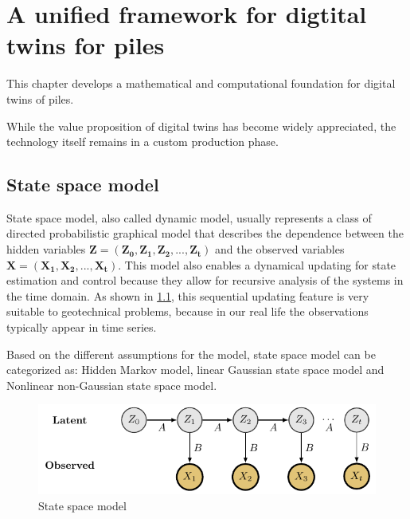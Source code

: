 

\chapter{A unified framework for digtital twins for piles}


This chapter develops a mathematical and computational foundation for digital twins of piles.

While the value proposition of digital twins has become widely appreciated, the technology itself remains in a custom production phase.



\section{State space model}




State space model, also called dynamic model, usually represents a class of directed probabilistic graphical model that describes the dependence between the hidden variables $\boldsymbol{Z} = (\boldsymbol{Z_0},\boldsymbol{Z_1},\boldsymbol{Z_2},...,\boldsymbol{Z_t})$ and the observed variables $\boldsymbol{X} = (\boldsymbol{X_1},\boldsymbol{X_2},...,\boldsymbol{X_t})$. This model also enables a dynamical updating for state estimation and control because they allow for recursive analysis of the systems in the time domain. As shown in \cref{fig:state-space-model}, this sequential updating feature is very suitable to geotechnical problems, because in our real life the observations typically appear in time series.



Based on the different assumptions for the model, state space model can be categorized as: Hidden Markov model, linear Gaussian state space model and Nonlinear non-Gaussian state space model.
\begin{figure}[H]
    \centering
    \includegraphics[width = 140mm]{Figures/figure-SSM.pdf}
    \caption{State space model}
    \label{fig:state-space-model}
\end{figure}



